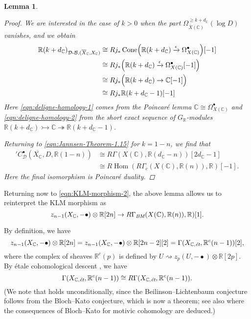 \documentclass[10pt,a4paper,oneside,draft]{article}
\DeclareMathOperator{\Cone}{Cone}
\DeclareMathOperator{\Hom}{Hom}
\newcommand{\CC}{\mathbb{C}}
\newcommand{\RR}{\mathbb{R}}
\newcommand{\BM}{\text{\it BM}}
\newcommand{\DB}{{\mathcal{D}\text{-}\mathcal{B}}}
\newcommand{\et}{\text{\it \'{e}t}}
\newcommand{\RHom}{R\!\Hom}
\theoremstyle{myplain}
\newtheorem{lemma}[theorem]{Lemma}
\theoremstyle{mydefinition}
\numberwithin{equation}{section}
\begin{document}
\begin{lemma}
\begin{proof}
    We are interested in the case of $k > 0$ when the part
    $\Omega^{\geqslant k + d_\CC}_{\overline{X} (\CC)} (\log D)$ vanishes, and
    we obtain
    \begin{align}
      \notag \RR (k + d_\CC)_{\DB, (\overline{X}_\CC,X_\CC)} & \cong
                                     R j_* \Cone \Bigl(\RR (k + d_\CC)
                                     \xrightarrow{\epsilon}
                                     \Omega_{X (\CC)}^\bullet \Bigr) [-1] \\
      \notag & \cong R j_* \Bigl(\RR (k + d_\CC) \xrightarrow{\epsilon}
               \Omega_{X (\CC)}^\bullet [-1] \Bigr) \\
      \label{eqn:deligne-homology-1} & \cong R j_* \Bigl(\RR (k + d_\CC) \to \CC [-1] \Bigr) \\
      \label{eqn:deligne-homology-2} & \cong R j_* \RR (k + d_\CC - 1) [-1]
    \end{align}
    Here \eqref{eqn:deligne-homology-1} comes from the Poincar\'{e} lemma
    $\CC \cong \Omega_{X (\CC)}^\bullet$ and \eqref{eqn:deligne-homology-2}
    from the short exact sequence of $G_\RR$-modules
    $\RR (k + d_\CC) \rightarrowtail \CC \twoheadrightarrow \RR (k + d_\CC - 1)$.

    Returning to \eqref{eqn:Jannsen-Theorem-1.15} for $k = 1-n$, we find that
    \begin{align*}
      {}' C^\bullet_\mathcal{D} (\overline{X_\CC}, D, \RR (1-n)) & \cong
      R\Gamma (X (\CC), \RR (d_\CC - n)) [2d_\CC-1] \\
      & \cong \RHom (R\Gamma_c (X (\CC), \RR (n)), \RR) [-1].
    \end{align*}
    Here the final isomorphism is Poincar\'{e} duality.
  \end{proof}
\end{lemma}

Returning now to \eqref{eqn:KLM-morphism-2}, the above lemma allows us to
reinterpret the KLM morphism as
\begin{equation}
  \label{eqn:KLM-morphism-3}
  z_{n-1} (X_\CC, -\bullet) \otimes \RR [2n] \to
  R\Gamma_\BM (X (\CC), \RR (n)), \RR) [1].
\end{equation}

By definition, we have
\begin{equation}
  \label{eqn:KLM-morphism-4}
  z_{n-1} (X_\CC, -\bullet) \otimes \RR [2n] =
  z_{n-1} (X_\CC, -\bullet) \otimes \RR [2n-2] [2] =
  \Gamma (X_{\CC,\et}, \RR^c (n-1)) [2],
\end{equation}
where the complex of sheaves $\RR^c (p)$ is defined by
$U \rightsquigarrow z_p (U, -\bullet) \otimes \RR [2p]$.
By \'{e}tale cohomological descent \cite[Theorem~3.1]{Geisser-2010},
we have
\begin{equation}
  \label{eqn:KLM-morphism-5}
  \Gamma (X_{\CC,\et}, \RR^c (n-1)) \cong R\Gamma (X_{\CC,\et}, \RR^c (n-1)).
\end{equation}
(We note that \cite[Theorem~3.1]{Geisser-2010} holds unconditionally, since the
Beilinson--Lichtenbaum conjecture follows from the Bloch--Kato conjecture, which
is now a theorem; see also \cite{Geisser-2004-Dedekind} where the consequences
of Bloch--Kato for motivic cohomology are deduced.)
\end{document}
